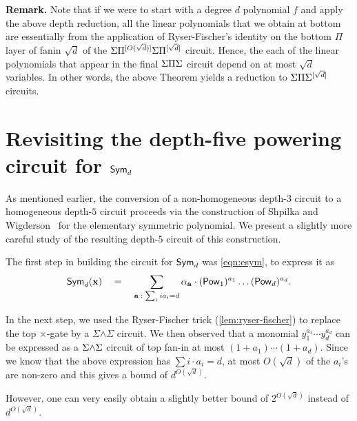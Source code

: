 {\bf Remark. } Note that if we were to start with a degree $d$
polynomial $f$ and apply the above depth reduction, all the linear
polynomials that we obtain at bottom are essentially from the
application of Ryser-Fischer's identity on the bottom $\Pi$ layer of
fanin $\sqrt{d}$ of the $\Sigma\Pi^{[O(\sqrt{d})]}\Sigma\Pi^{[\sqrt{d}]}$ circuit.
Hence, the each of the linear polynomials that appear in the final
$\Sigma\Pi\Sigma$ circuit depend on at most $\sqrt{d}$ variables.
In other words, the above Theorem yields a reduction to
$\Sigma\Pi\Sigma^{[\sqrt{d}]}$ circuits.

\section{Revisiting the depth-five powering circuit for $\operatorname{\mathsf{Sym}}_d$ }

As mentioned earlier, the conversion of a non-homogeneous depth-$3$
circuit to a homogeneous depth-$5$ circuit proceeds via the
construction of Shpilka and Wigderson~\cite{sw2001} for the elementary
symmetric polynomial.
We present a slightly more careful study of the resulting depth-$5$ circuit of
this construction.

The first step in building the circuit for $\operatorname{\mathsf{Sym}}_d$ was \eqref{eqn:esym}, to express it as
\[
\operatorname{\mathsf{Sym}}_d(\mathbf{x}) \quad = \quad \sum_{\mathbf{a}\;:\; \sum_i ia_i = d} \alpha_{\mathbf{a}} \cdot (\operatorname{\mathsf{Pow}}_1)^{a_1}\dots (\operatorname{\mathsf{Pow}}_d)^{a_d}.
\]

In the next step, we used the Ryser-Fischer trick
(\autoref{lem:ryser-fischer}) to replace the top $\times$-gate by a
$\Sigma\mathord{\wedge}\Sigma$ circuit.
We then observed that a monomial $y_1^{a_1}\cdots y_d^{a_d}$ can be
expressed as a $\Sigma\mathord{\wedge}\Sigma$ circuit of top fan-in at most $(1 + a_1)\cdots
(1+a_d)$.
Since we know that the above expression has $\sum i \cdot a_i = d$, at
most $O(\sqrt{d})$ of the $a_i$'s are non-zero and this gives a bound
of $d^{O(\sqrt{d})}$. 

However, one can very easily obtain a slightly better bound of
$2^{O(\sqrt{d})}$ instead of $d^{O(\sqrt{d})}$. 

